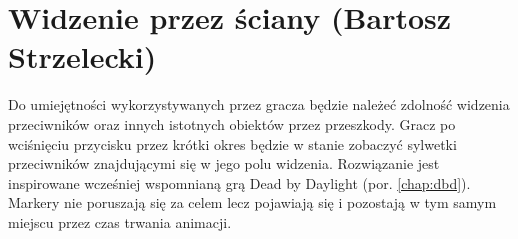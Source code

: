 \section{Widzenie przez ściany (Bartosz Strzelecki)}\label{s:wid_proj}

Do umiejętności wykorzystywanych przez gracza będzie należeć zdolność widzenia przeciwników oraz innych istotnych obiektów przez przeszkody.
Gracz po wciśnięciu przycisku przez krótki okres będzie w stanie zobaczyć sylwetki przeciwników znajdującymi się w jego polu widzenia.
Rozwiązanie jest inspirowane wcześniej wspomnianą grą Dead by Daylight (por. \ref{chap:dbd}). Markery nie poruszają się za celem lecz pojawiają się i pozostają w tym samym miejscu przez czas trwania animacji.


